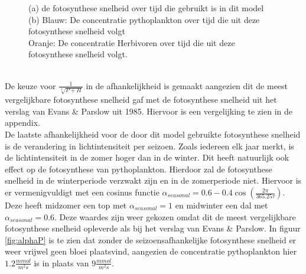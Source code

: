 \begin{figure}[H]
    \centering
    
    \caption{(a) de fotosynthese snelheid over tijd die gebruikt is in dit model \\
    (b) Blauw: De concentratie pythoplankton over tijd die uit deze fotosynthese snelheid volgt\\
    Oranje: De concentratie Herbivoren over tijd die uit deze fotosynthese snelheid volgt.}
    \label{alphaPH}
\end{figure}

\\
De keuze voor $\frac{1}{\sqrt[3]{P+H}}$ in de afhankelijkheid is gemaakt aangezien dit de meest vergelijkbare fotosynthese snelheid gaf met de fotosynthese snelheid uit het verslag van Evans \& Parslow uit 1985. Hiervoor is een vergelijking te zien in de appendix.
\newline
\\
De laatste afhankelijkheid voor de door dit model gebruikte fotosynthese snelheid is de verandering in lichtintensiteit per seizoen. Zoals iedereen elk jaar merkt, is de lichtintensiteit in de zomer hoger dan in de winter. Dit heeft natuurlijk ook effect op de fotosynthese van pythoplankton. Hierdoor zal de fotosynthese snelheid in de winterperiode verzwakt zijn en in de zomerperiode niet. Hiervoor is er vermenigvuldigt met een cosinus functie $\alpha_{seasonal}=0.6-0.4\cos\left({\frac{2\pi}{365.25\tau}}\right)$. Deze heeft midzomer een top met $\alpha_{seasonal}=1$ en midwinter een dal met $\alpha_{seasonal}=0.6$. Deze waardes zijn weer gekozen omdat dit de meest vergelijkbare fotosynthese snelheid opleverde als bij het verslag van Evans \& Parslow. 
In figuur \ref{fig:alphaP} is te zien dat zonder de seizoensafhankelijke fotosynthese snelheid er weer vrijwel geen bloei plaatsvind, aangezien de concentratie pythoplankton hier $1.2 \frac{mmol}{m^2s}$ is in plaats van $9 \frac{mmol}{m^2s}$.


